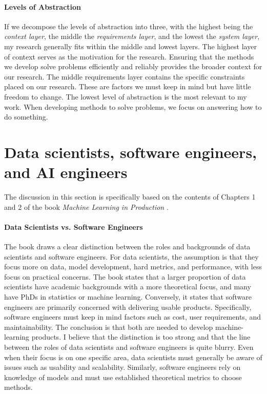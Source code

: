 \documentclass[12pt]{article}
\begin{document}
\paragraph{Levels of Abstraction} If we decompose the levels of abstraction into three, with the highest being the \textit{context layer}, the middle the \textit{requirements layer}, and the lowest the \textit{system layer}, my research generally fits within the middle and lowest layers.
The highest layer of context serves as the motivation for the research. Ensuring that the methods we develop solve problems efficiently and reliably provides the broader context for our research. The middle requirements layer contains the specific constraints placed on our research. These are factors we must keep in mind but have little freedom to change.
The lowest level of abstraction is the most relevant to my work. When developing methods to solve problems, we focus on answering how to do something.
\section{Data scientists, software engineers, and AI engineers}
The discussion in this section is specifically based on the contents of Chapters 1 and 2 of the book \textit{Machine Learning in Production} \cite{K:25}.
\paragraph{Data Scientists vs. Software Engineers} The book draws a clear distinction between the roles and backgrounds of data scientists and software engineers. For data scientists, the assumption is that they focus more on data, model development, hard metrics, and performance, with less focus on practical concerns. The book states that a larger proportion of data scientists have academic backgrounds with a more theoretical focus, and many have PhDs in statistics or machine learning. Conversely, it states that software engineers are primarily concerned with delivering usable products. Specifically, software engineers must keep in mind factors such as cost, user requirements, and maintainability. The conclusion is that both are needed to develop machine-learning products.
I believe that the distinction is too strong and that the line between the roles of data scientists and software engineers is quite blurry. Even when their focus is on one specific area, data scientists must generally be aware of issues such as usability and scalability. Similarly, software engineers rely on knowledge of models and must use established theoretical metrics to choose methods.
\end{document}
